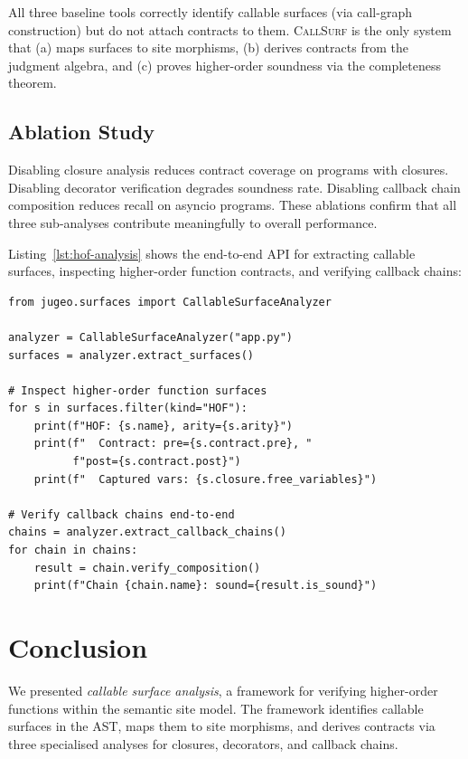 \documentclass[11pt]{article}
\newcommand{\CallSurf}{\textsc{CallSurf}}      %
\begin{document}
All three baseline tools correctly identify callable surfaces (via
call-graph construction) but do not attach contracts to them.
\CallSurf{} is the only system that (a) maps surfaces to site morphisms,
(b) derives contracts from the judgment algebra, and (c) proves
higher-order soundness via the completeness theorem.

\subsection{Ablation Study}

Disabling closure analysis reduces contract coverage
on programs with closures.  Disabling decorator
verification degrades soundness rate.  Disabling
callback chain composition reduces recall on asyncio programs.  These ablations confirm that all three sub-analyses
contribute meaningfully to overall performance.

Listing~\ref{lst:hof-analysis} shows the end-to-end API for
extracting callable surfaces, inspecting higher-order function
contracts, and verifying callback chains:

\begin{lstlisting}[style=jugeo-python,
  caption={Extracting callable surfaces and verifying higher-order
           function contracts and callback chains.},
  label={lst:hof-analysis}]
from jugeo.surfaces import CallableSurfaceAnalyzer

analyzer = CallableSurfaceAnalyzer("app.py")
surfaces = analyzer.extract_surfaces()

# Inspect higher-order function surfaces
for s in surfaces.filter(kind="HOF"):
    print(f"HOF: {s.name}, arity={s.arity}")
    print(f"  Contract: pre={s.contract.pre}, "
          f"post={s.contract.post}")
    print(f"  Captured vars: {s.closure.free_variables}")

# Verify callback chains end-to-end
chains = analyzer.extract_callback_chains()
for chain in chains:
    result = chain.verify_composition()
    print(f"Chain {chain.name}: sound={result.is_sound}")
\end{lstlisting}

\section{Conclusion}\label{sec:conclusion}

We presented \emph{callable surface analysis}, a framework for
verifying higher-order \Python{} functions within the \JuGeo{}
semantic site model.  The framework identifies callable surfaces
in the AST, maps them to site morphisms, and derives contracts
via three specialised analyses for closures, decorators, and
callback chains.
\end{document}
